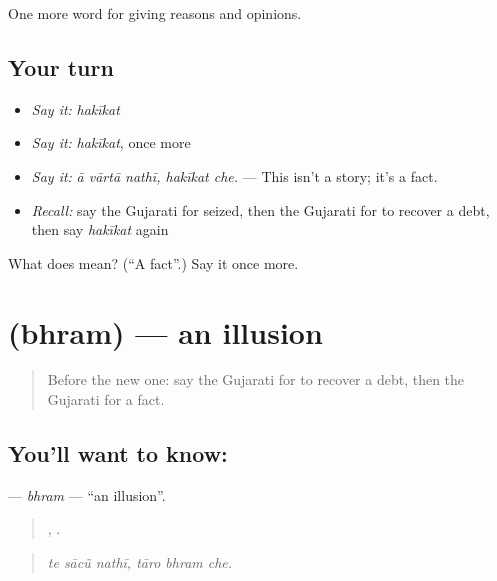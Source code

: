 \begin{grammarlens}[title={What you've built}]
One more word for giving reasons and opinions.
\end{grammarlens}

\subsection*{Your turn}
\begin{itemize}
\raggedright
  \item \emph{Say it:} \emph{hakīkat}
  \item \emph{Say it:} \emph{hakīkat}, once more
  \item \emph{Say it:} \emph{ā vārtā nathī, hakīkat che.} — This isn't a story; it's a fact.
  \item \emph{Recall:} say the Gujarati for seized, then the Gujarati for to recover a debt, then say \emph{hakīkat} again
\end{itemize}

\begin{tcolorbox}[breakable,colback=teal!4,colframe=teal!35!black,title={Before you move on}]
What does  mean? (\textquotedblleft{}A fact\textquotedblright{}.) Say it once more.
\end{tcolorbox}
\section[\texorpdfstring{\gu{ભ્રમ} (bhram)}{ભ્રમ (bhram)}]{ (bhram) — an illusion}

\label{lesson:GU-C351-bhram}



\begin{quote}
Before the new one: say the Gujarati for to recover a debt, then the Gujarati for a fact.
\end{quote}

\subsection*{You'll want to know: }
\textbf{} — \emph{bhram} — \textquotedblleft{}an illusion\textquotedblright{}.

\begin{quote}
  ,   .
\end{quote}

\begin{quote}
\emph{te sācũ nathī, tāro bhram che.}
\end{quote}

